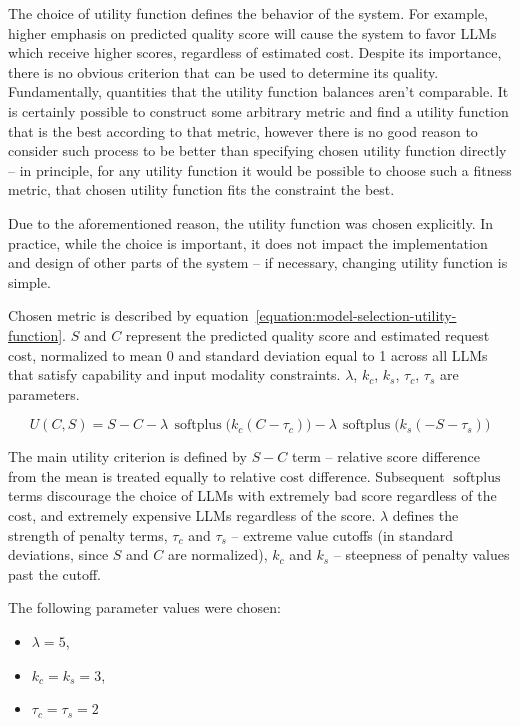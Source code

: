 \documentclass[a4paper,11pt,twoside]{report}
\theoremstyle{definition}
\begin{document}
The choice of utility function defines the behavior of the system. For example, higher emphasis on predicted quality score will cause the system to favor LLMs which receive higher scores, regardless of estimated cost. Despite its importance, there is no obvious criterion that can be used to determine its quality. Fundamentally, quantities that the utility function balances aren't comparable. It is certainly possible to construct some arbitrary metric and find a utility function that is the best according to that metric, however there is no good reason to consider such process to be better than specifying chosen utility function directly -- in principle, for any utility function it would be possible to choose such a fitness metric, that chosen utility function fits the constraint the best.

Due to the aforementioned reason, the utility function was chosen explicitly. In practice, while the choice is important, it does not impact the implementation and design of other parts of the system -- if necessary, changing utility function is simple.

Chosen metric is described by equation~\ref{equation:model-selection-utility-function}. $S$ and $C$ represent the predicted quality score and estimated request cost, normalized to mean 0 and standard deviation equal to 1 across all LLMs that satisfy capability and input modality constraints. $\lambda$, $k_c$, $k_s$, $\tau_c$, $\tau_s$ are parameters.

\begin{equation}
\label{equation:model-selection-utility-function}
    U(C, S) = S - C - \lambda \, \operatorname{softplus}\bigl(k_c(C - \tau_c)\bigr) - \lambda \, \operatorname{softplus}\bigl(k_s(-S - \tau_s)\bigr)
\end{equation}

The main utility criterion is defined by $S-C$ term -- relative score difference from the mean is treated equally to relative cost difference. Subsequent $\operatorname{softplus}$ terms discourage the choice of LLMs with extremely bad score regardless of the cost, and extremely expensive LLMs regardless of the score. $\lambda$ defines the strength of penalty terms, $\tau_c$ and $\tau_s$ -- extreme value cutoffs (in standard deviations, since $S$ and $C$ are normalized), $k_c$ and $k_s$ -- steepness of penalty values past the cutoff.

The following parameter values were chosen:

\begin{itemize}
    \item $\lambda = 5$,
    \item $k_c = k_s = 3$,
    \item $\tau_c = \tau_s = 2$
\end{itemize}
\end{document}
